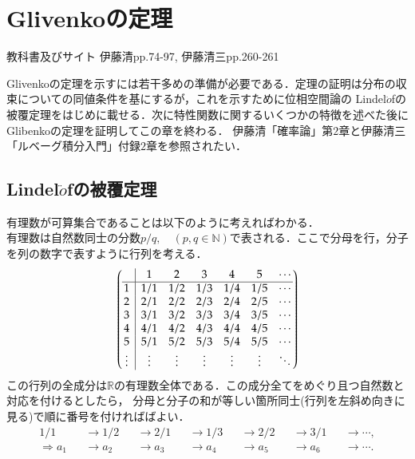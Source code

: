 \documentclass[a4j,papersize,disablejfam,slide,14pt]{jsarticle}
\begin{document}
\section{{\rm Glivenko}の定理}
\label{sec:glivenko_theorem}
	\begin{itembox}[l]{教科書及びサイト}
    	{\rm 伊藤清\cite{ito_probability}pp.74-97, 伊藤清三\cite{ito_lebesgue}pp.260-261}
    \end{itembox}
	{\rm Glivenko}の定理を示すには若干多めの準備が必要である．定理の証明は分布の収束についての同値条件を基にするが，これを示すために位相空間論の
    {\rm Lindel$\ddot{o}$f}の被覆定理をはじめに載せる．次に特性関数に関するいくつかの特徴を述べた後に{\rm Glibenko}の定理を証明してこの章を終わる．
    伊藤清「確率論」第$2$章と伊藤清三「ルベーグ積分入門」付録$2$章を参照されたい．
\subsection{{\rm Lindel$\ddot{o}$f}の被覆定理}
	有理数が可算集合であることは以下のように考えればわかる．\\
    有理数は自然数同士の分数$p/q,\quad (p,q \in \mathbb{N})$で表される．ここで分母を行，分子を列の数字で表すように行列を考える．
    \begin{align}
    \arraycolsep5pt
    	\left(
    	\begin{array}{@{\,}c|cccccc@{\,}}
    		&1&2&3&4&5&\cdots\\
    		\hline
    		1&1/1&1/2&1/3&1/4&1/5&\cdots\\
    		2&2/1&2/2&2/3&2/4&2/5&\cdots\\
    		3&3/1&3/2&3/3&3/4&3/5&\cdots\\
    		4&4/1&4/2&4/3&4/4&4/5&\cdots\\
    		5&5/1&5/2&5/3&5/4&5/5&\cdots\\
    		\vdots&\vdots&\vdots&\vdots&\vdots&\vdots&\ddots\\
    	\end{array}
    	\right)
    \end{align}
    この行列の全成分は$\mathbb{R}$の有理数全体である．この成分全てをめぐり且つ自然数と対応を付けるとしたら，
    分母と分子の和が等しい箇所同士(行列を左斜め向きに見る)で順に番号を付ければばよい．
    \begin{align}
    	1/1 &&\to 1/2 &&\to 2/1 &&\to 1/3 &&\to 2/2 &&\to 3/1 &&\to \cdots, \\
        \Rightarrow a_1 &&\to a_2 &&\to a_3 &&\to a_4 &&\to a_5 &&\to a_6 &&\to \cdots. \\
    \end{align}
\end{document}
